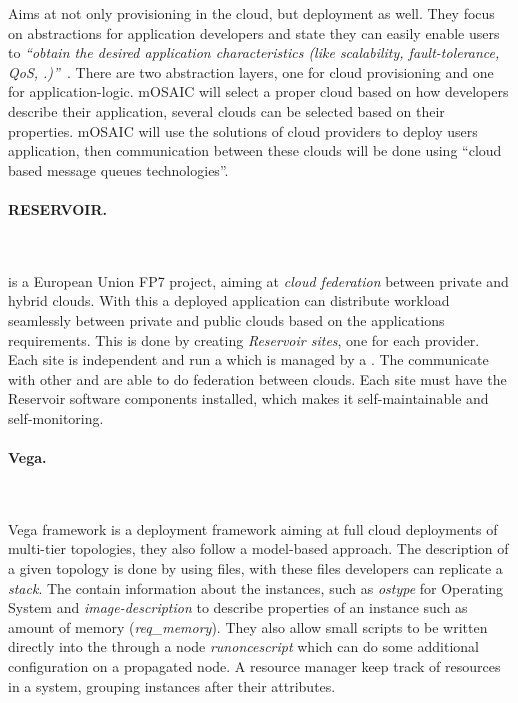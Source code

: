 Aims at not only provisioning in the cloud, but deployment as well.
They focus on abstractions for application developers and state they can easily enable users to
\emph{``obtain the desired application characteristics (like
scalability, fault-tolerance, QoS, \etc.)''}~\cite{architecturing:petcu11}.
There are two abstraction layers, one for cloud provisioning 
and one for application-logic.
mOSAIC will select a proper cloud based on how developers describe their application,
several clouds can be selected based on their properties.
mOSAIC will use the  solutions of cloud providers to deploy users application,
then communication between these clouds will be done using 
``cloud based message queues technologies''.

\paragraph{RESERVOIR.}~\cite{reservoir:rochweger09}

 is a European Union FP7 project, 
aiming at \emph{cloud federation} between private and 
hybrid clouds. With this a deployed application can distribute workload 
seamlessly between private and public clouds based on the applications requirements.
This is done by creating \emph{Reservoir sites}, one for each provider.
Each site is independent and run a  which is managed by a . 
The  communicate with other  and are able to do
federation between clouds. Each site must have the Reservoir software components 
installed, which makes it self-maintainable and self-monitoring.

\paragraph{Vega.}~\cite{simplifying:chieu10} 

Vega framework is a deployment framework aiming 
at full cloud deployments of multi-tier topologies, 
they also follow a model-based approach. 
The description of a given topology is done by using  files, with these files
developers can replicate a \emph{stack}.
The  contain information about the instances, such as \emph{ostype} for Operating System
and \emph{image-description} to describe properties of an instance such as amount of 
memory (\emph{req\_memory}).
They also allow small scripts to be written directly into the  through a node
\emph{runoncescript} which can do some additional configuration on a propagated node.
A resource manager keep track of resources in a system, grouping instances after their attributes.

